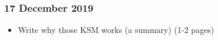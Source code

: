 \subsubsection{17 December 2019}

\begin{itemize}
\item Write why those KSM works (a summary) (1-2 pages)
\end{itemize}